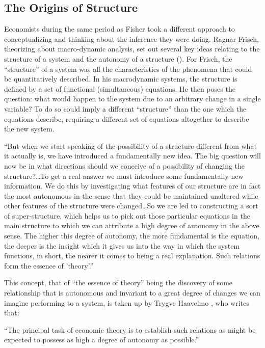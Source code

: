 \documentclass[a4paper,12pt]{article}
\begin{document}
\subsection{The Origins of Structure}

Economists during the same period as Fisher took a different approach to conceptualizing and thinking about the inference they were doing. Ragnar Frisch, theorizing about macro-dynamic analysis, set out several key ideas relating to the structure of a system and the autonomy of a structure (\cite{Frisch1995}). For Frisch, the ``structure'' of a system was all the characteristics of the phenomena that could be quantitatively described. In his macrodynamic systems, the structure is defined by a set of functional (simultaneous) equations. He then poses the question: what would happen to the system due to an arbitrary change in a single variable? To do so could imply a different ``structure'' than the one which the equations describe, requiring a different set of equations altogether to describe the new system.

\begin{displayquote}
``But when we start speaking of the possibility of a structure different from what it actually is, we have introduced a fundamentally new idea. The big question will now be in what directions should we conceive of a possibility of changing the structure?\ldots To get a real answer we must introduce some fundamentally new information. We do this by investigating what features of our structure are in fact the most autonomous in the sense that they could be maintained unaltered while other features of the structure were changed\ldots So we are led to constructing a sort of super-structure, which helps us to pick out those particular equations in the main structure to which we can attribute a high degree of autonomy in the above sense. The higher this degree of autonomy, the more fundamental is the equation, the deeper is the insight which it gives us into the way in which the system functions, in short, the nearer it comes to being a real explanation. Such relations form the essence of 'theory'.''
\end{displayquote}

This concept, that of ``the essence of theory'' being the discovery of some relationship that is autonomous and invariant to a great degree of changes we can imagine performing to a system, is taken up by Trygve Haavelmo \parencite*{Haavelmo1944}, who writes that:

\begin{displayquote}
``The principal task of economic theory is to establish such relations as might be expected to possess as high a degree of autonomy as possible.''
\end{displayquote}
\end{document}
